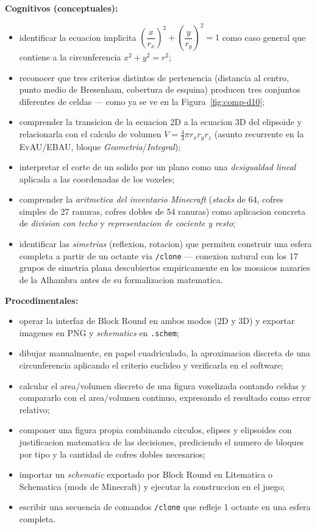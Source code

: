 \documentclass[12pt,a4paper]{scrartcl}
\newcommand{\cmd}[1]{\textcolor{earth}{\texttt{\small #1}}}
\begin{document}
\textbf{Cognitivos (conceptuales):}
\begin{itemize}[leftmargin=1.3em,itemsep=0.2em,topsep=0.3em]
  \item identificar la ecuacion implicita $\left(\dfrac{x}{r_x}\right)^{\!2} + \left(\dfrac{y}{r_y}\right)^{\!2} = 1$ como caso general que contiene a la circunferencia $x^2 + y^2 = r^2$;
  \item reconocer que tres criterios distintos de pertenencia (distancia al centro, punto medio de Bresenham, cobertura de esquina) producen tres conjuntos diferentes de celdas --- como ya se ve en la Figura~\ref{fig:comp-d10};
  \item comprender la transicion de la ecuacion 2D a la ecuacion 3D del elipsoide y relacionarla con el calculo de volumen $V = \tfrac{4}{3}\pi r_x r_y r_z$ (asunto recurrente en la EvAU/EBAU, bloque \emph{Geometria}/\emph{Integral});
  \item interpretar el corte de un solido por un plano como una \emph{desigualdad lineal} aplicada a las coordenadas de los voxeles;
  \item comprender la \emph{aritmetica del inventario Minecraft} (\emph{stacks} de 64, cofres simples de 27 ranuras, cofres dobles de 54 ranuras) como aplicacion concreta de \emph{division con techo} y \emph{representacion de cociente y resto};
  \item identificar las \emph{simetrias} (reflexion, rotacion) que permiten construir una esfera completa a partir de un octante via \cmd{/clone} --- conexion natural con los 17 grupos de simetria plana descubiertos empiricamente en los mosaicos nazaries de la Alhambra antes de su formalizacion matematica.
\end{itemize}

\textbf{Procedimentales:}
\begin{itemize}[leftmargin=1.3em,itemsep=0.2em,topsep=0.3em]
  \item operar la interfaz de Block Round en ambos modos (2D y 3D) y exportar imagenes en PNG y \emph{schematics} en \texttt{.schem};
  \item dibujar manualmente, en papel cuadriculado, la aproximacion discreta de una circunferencia aplicando el criterio euclideo y verificarla en el software;
  \item calcular el area/volumen discreto de una figura voxelizada contando celdas y compararlo con el area/volumen continuo, expresando el resultado como error relativo;
  \item componer una figura propia combinando circulos, elipses y elipsoides con justificacion matematica de las decisiones, prediciendo el numero de bloques por tipo y la cantidad de cofres dobles necesarios;
  \item importar un \emph{schematic} exportado por Block Round en Litematica o Schematica (mods de Minecraft) y ejecutar la construccion en el juego;
  \item escribir una secuencia de comandos \cmd{/clone} que refleje 1 octante en una esfera completa.
\end{itemize}
\end{document}
